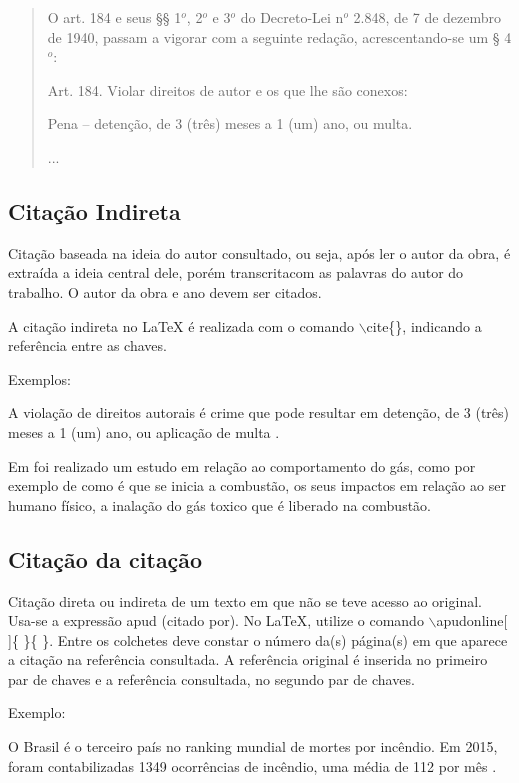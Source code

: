 \begin{quote}
\small{		
O art. 184 e seus §§ 1$^o$, 2$^o$ e 3$^o$ do Decreto-Lei n$^o$ 2.848, de 7 de dezembro de 1940, passam a vigorar com a seguinte redação, acrescentando-se um § 4$^o$:

        Art. 184. Violar direitos de autor e os que lhe são conexos:

        Pena – detenção, de 3 (três) meses a 1 (um) ano, ou multa.

        ...
        \cite{lei10695}}
\end{quote}

\subsection{Citação Indireta}
Citação baseada na ideia do autor consultado, ou seja, após ler o autor da obra, é extraída a ideia central dele, porém transcritacom as palavras do autor do trabalho. O autor da obra e ano devem ser citados.

A citação indireta no LaTeX é realizada com o comando $\backslash$cite\{\}, indicando a referência entre as chaves.

Exemplos:

A violação de direitos autorais é crime que pode resultar em detenção, de 3 (três) meses a 1 (um) ano, ou aplicação de multa \cite{lei10695}.

Em \cite{severo2018} foi realizado um estudo em relação ao comportamento do gás, como por exemplo de como é que se inicia a combustão, os seus impactos em relação ao ser humano físico, a inalação do gás toxico que é liberado na combustão.


\subsection{Citação da citação}
Citação direta ou indireta de um texto em que não se teve acesso ao original. Usa-se a expressão apud (citado por). No LaTeX, utilize o comando $\backslash$apudonline[ ]\{ \}\{ \}. Entre os colchetes deve constar o número da(s) página(s) em que aparece a citação na referência consultada. A referência original é inserida no primeiro par de chaves e a referência consultada, no segundo par de chaves.

Exemplo:

O Brasil é o terceiro país no ranking mundial de mortes por incêndio. Em 2015, foram contabilizadas 1349 ocorrências de incêndio, uma média de 112 por mês .

